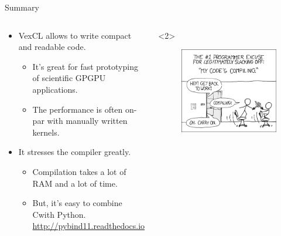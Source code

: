 \documentclass[@BEAMER_OPTIONS@]{beamer}
\newcommand{\CXX}{{\rm C}\plusplus}
\newcommand{\www}[1]{\href{#1}{#1}}
\begin{document}
\begin{frame}[fragile]{Summary}
    \begin{columns}
        \begin{column}[t]{0.6\textwidth}
            \begin{itemize}
                \item VexCL allows to write compact and readable code.
                    \begin{itemize}
                        \item It's great for fast prototyping of scientific
                            GPGPU applications.
                            \vspace{0.5\baselineskip}
                        \item The performance is often on-par with manually
                            written kernels.
                    \end{itemize}
                    \vspace{\baselineskip}
                    \pause
                \item It stresses the compiler greatly.
                    \begin{itemize}
                        \item Compilation takes a lot of RAM and a lot of
                            time.
                        \item But, it's easy to combine \CXX with Python.
                            \www{http://pybind11.readthedocs.io}
                    \end{itemize}
            \end{itemize}
        \end{column}
        \begin{column}[t]{0.35\textwidth}
            \begin{uncoverenv}<2>
                \begin{figure}
                    \includegraphics[width=\textwidth]{compiling.png}

\end{figure}
\end{uncoverenv}
\end{column}
\end{columns}
\end{frame}
\end{document}
